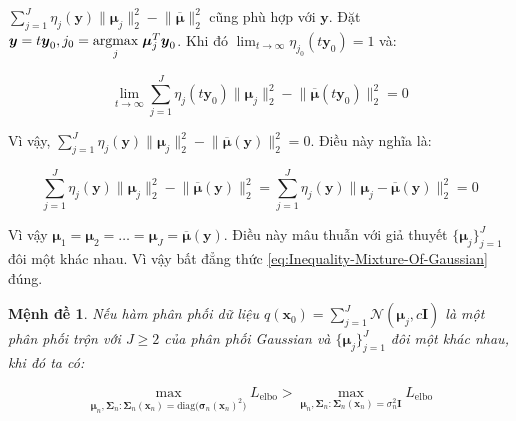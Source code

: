 \documentclass[14pt, a4paper]{article}
\numberwithin{equation}{section}
\numberwithin{figure}{section}
\newtheorem{md}{Mệnh đề}
\numberwithin{dl}{section}
\numberwithin{md}{section}
\numberwithin{bd}{section}
\numberwithin{dn}{section}
\numberwithin{hq}{section}
\begin{document}
    $\sum_{j=1}^J \eta_j (\boldsymbol{y}) \lVert \boldsymbol{\mu}_j \rVert_2^2 - \lVert \overline{\boldsymbol{\mu}} \rVert_2^2$ cũng phù hợp với $\boldsymbol{y}$.
    Đặt $\boldsymbol{y} = t\boldsymbol{y}_0, j_0 = \underset{j}{\mathrm{argmax}} \thickspace \boldsymbol{\mu}_j^T \boldsymbol{y}_0$. Khi đó $\lim_{t \rightarrow \infty} \eta_{j_0} (t \boldsymbol{y}_0)=1$ và:

    \begin{equation}
        \lim_{t \rightarrow \infty} \sum_{j=1}^J \eta_j (t \boldsymbol{y}_0) \lVert \boldsymbol{\mu}_j \rVert_2^2 - \lVert \overline{\boldsymbol{\mu}} (t \boldsymbol{y}_0) \rVert_2^2 =0
    \end{equation}

    Vì vậy, $\sum_{j=1}^J \eta_j (\boldsymbol{y}) \lVert \boldsymbol{\mu}_j \rVert_2^2 - \lVert \overline{\boldsymbol{\mu}} (\boldsymbol{y})  \rVert_2^2 = 0$. Điều này nghĩa là:

    \begin{equation}
        \sum_{j=1}^J \eta_j (\boldsymbol{y}) \lVert \boldsymbol{\mu}_j \rVert_2^2 - \lVert \overline{\boldsymbol{\mu}} (\boldsymbol{y}) \rVert_2^2 = \sum_{j=1}^J \eta_j (\boldsymbol{y}) \lVert \boldsymbol{\mu}_j - \overline{\boldsymbol{\mu}} (\boldsymbol{y}) \rVert_2^2 = 0
    \end{equation}

    Vì vậy $\boldsymbol{\mu}_1 = \boldsymbol{\mu}_2 = \dots = \boldsymbol{\mu}_J = \overline{\boldsymbol{\mu}} (\boldsymbol{y})$.
    Điều này mâu thuẫn với giả thuyết $\lbrace \boldsymbol{\mu}_j \rbrace_{j=1}^J$ đôi một khác nhau.
    Vì vậy bất đẳng thức \ref{eq:Inequality-Mixture-Of-Gaussian} đúng.

    \begin{md} \label{md:Mixture-Data-Distribution}
        Nếu hàm phân phối dữ liệu $q(\boldsymbol{x}_0)=\sum_{j=1}^J \mathcal{N} (\boldsymbol{\mu}_j, c \boldsymbol{I})$ là một phân phối trộn với $J \geq 2$ của phân phối Gaussian và $\lbrace \boldsymbol{\mu}_j \rbrace_{j=1}^J$ đôi một khác nhau, khi đó ta có:

        \begin{equation}
            \max_{\boldsymbol{\mu}_n, \boldsymbol{\Sigma}_n:\boldsymbol{\Sigma}_n(\boldsymbol{x}_n)=\mathrm{diag}\big( \boldsymbol{\sigma}_n (\boldsymbol{x}_n)^2 \big)} L_{\mathrm{elbo}} > \max_{\boldsymbol{\mu}_n, \boldsymbol{\Sigma}_n:\boldsymbol{\Sigma}_n(\boldsymbol{x}_n)=\sigma_n^2 \boldsymbol{I}} L_{\mathrm{elbo}}
        \end{equation}
    \end{md}
\end{document}
